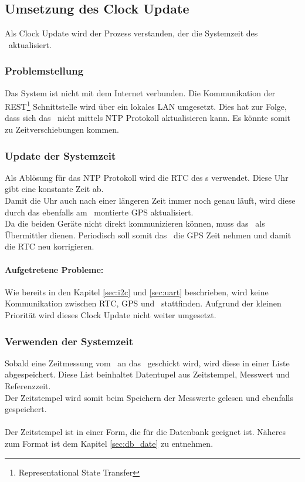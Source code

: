 \subsection{Umsetzung des Clock Update}
Als Clock Update wird der Prozess verstanden, der die Systemzeit des \rpi\ aktualisiert.

\subsubsection{Problemstellung}
Das System ist nicht mit dem Internet verbunden. Die Kommunikation der REST\footnote{Representational State Transfer} Schnittstelle wird über ein lokales LAN umgesetzt. Dies hat zur Folge, dass sich das \rpi\ nicht mittels NTP Protokoll aktualisieren kann. Es könnte somit zu Zeitverschiebungen kommen.

\subsubsection{Update der Systemzeit}
Als Ablösung für das NTP Protokoll wird die RTC des \hwb s verwendet. Diese Uhr gibt eine konstante Zeit ab.\\
Damit die Uhr auch nach einer längeren Zeit immer noch genau läuft, wird diese durch das ebenfalls am \hwb\ montierte GPS aktualisiert.\\
Da die beiden Geräte nicht direkt kommunizieren können, muss das \rpi\ als Übermittler dienen. Periodisch soll somit das \rpi\ die GPS Zeit nehmen und damit die RTC neu korrigieren.
\paragraph{Aufgetretene Probleme:} Wie bereits in den Kapitel \ref{sec:i2c} und \ref{sec:uart} beschrieben, wird keine Kommunikation zwischen RTC, GPS und \rpi\ stattfinden. Aufgrund der kleinen Priorität wird dieses Clock Update nicht weiter umgesetzt.

\subsubsection{Verwenden der Systemzeit}
Sobald eine Zeitmessung vom \hwb\ an das \rpi\ geschickt wird, wird diese in einer Liste abgespeichert. Diese List beinhaltet Datentupel aus Zeitstempel, Messwert und Referenzzeit.\\
Der Zeitstempel wird somit beim Speichern der Messwerte gelesen und ebenfalls gespeichert.\\
\\
Der Zeitstempel ist in einer Form, die für die Datenbank geeignet ist. Näheres zum Format ist dem Kapitel \ref{sec:db_date} zu entnehmen.